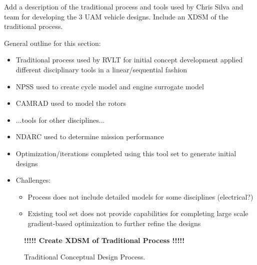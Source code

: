 
Add a description of the traditional process and tools used by Chris Silva and team for developing the 3 UAM vehicle designs.  Include an XDSM of the traditional process.  

General outline for this section:
\begin{itemize}
    \item Traditional process used by RVLT for initial concept development applied different disciplinary tools in a linear/sequential fashion
    \item NPSS used to create cycle model and engine surrogate model
    \item CAMRAD used to model the rotors
    \item ...tools for other disciplines...
    \item NDARC used to determine mission performance
    \item Optimization/iterations completed using this tool set to generate initial designs
    \item Challenges:
    \begin{itemize}
        \item Process does not include detailed models for some disciplines (electrical?)
        \item Existing tool set does not provide capabilities for completing large scale gradient-based optimization to further refine the designs
    \end{itemize}
\end{itemize}


\begin{figure}[htb]
\begin{center}
 \textbf{!!!!! Create XDSM of Traditional Process !!!!!}
 \caption{Traditional Conceptual Design Process.}
 \label{f:trad_XDSM}
\end{center}
\end{figure}

